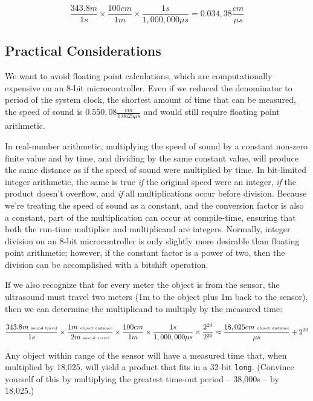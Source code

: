 \[
    \frac{343.8 m}{1 s} \times \frac{100 cm}{1 m} \times \frac{1 s}{1,000,000 \mu s} = 0.034,38 \frac{cm}{\mu s}
\]

\subsection{Practical Considerations}

We want to avoid floating point calculations, which are computationally expensive on an 8-bit microcontroller.
Even if we reduced the denominator to period of the system clock, the shortest amount of time that can be measured, the speed of sound is $0.550,08 \frac{cm}{0.0625\mu s}$ and would still require floating point arithmetic.


In real-number arithmetic, multiplying the speed of sound by a constant non-zero finite value and by time, and dividing by the same constant value, will produce the same distance as if the speed of sound were multiplied by time.
In bit-limited integer arithmetic, the same is true \textit{if} the original speed were an integer, \textit{if} the product doesn't overflow, and \textit{if} all multiplications occur before division.
Because we're treating the speed of sound as a constant, and the conversion factor is also a constant, part of the multiplication can occur at compile-time, ensuring that both the run-time multiplier and multiplicand are integers.
Normally, integer division on an 8-bit microcontroller is only slightly more desirable than floating point arithmetic;
however, if the constant factor is a power of two, then the division can be accomplished with a bitshift operation.

If we also recognize that for every meter the object is from the sensor, the ultrasound must travel two meters (1m to the object plus 1m back to the sensor), then we can determine the multiplicand to multiply by the measured time:

\[
    \frac{343.8 m~\mathrm{\mbox{\tiny sound~travel}}}{1 s} \times \frac{1 m~\mathrm{\mbox{\tiny object~distance}}}{2 m~\mathrm{\mbox{\tiny sound~travel}}} \times \frac{100 cm}{1 m} \times \frac{1 s}{1,000,000 \mu s} \times \frac{2^{20}}{2^{20}} \approx \frac{18,025 cm~\mathrm{\mbox{\tiny object~distance}}}{\mu s} \div 2^{20}
\]

Any object within range of the sensor will have a measured time that, when multiplied by 18,025, will yield a product that fits in a 32-bit \lstinline{long}.
(Convince yourself of this by multiplying the greatest time-out period -- 38,000\textmu s -- by 18,025.)

